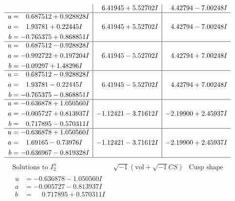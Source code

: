 \documentclass[1p]{elsarticle_modified}
\theoremstyle{definition}
\newcommand{\I}{\sqrt{-1}}
\begin{document}
$$\begin{array}{c|c|c}
 & \phantom{-}6.41945 + 5.52702 I & \phantom{-}4.42794 - 7.00248 I \\ \hline\begin{aligned}
u &= \phantom{-}0.687512 + 0.928828 I \\
a &= \phantom{-}1.93781 + 0.22445 I \\
b &= -0.765375 + 0.868851 I\end{aligned}
 & \phantom{-}6.41945 + 5.52702 I & \phantom{-}4.42794 - 7.00248 I \\ \hline\begin{aligned}
u &= \phantom{-}0.687512 - 0.928828 I \\
a &= -0.992722 + 0.197204 I \\
b &= -0.09297 + 1.48296 I\end{aligned}
 & \phantom{-}6.41945 - 5.52702 I & \phantom{-}4.42794 + 7.00248 I \\ \hline\begin{aligned}
u &= \phantom{-}0.687512 - 0.928828 I \\
a &= \phantom{-}1.93781 - 0.22445 I \\
b &= -0.765375 - 0.868851 I\end{aligned}
 & \phantom{-}6.41945 - 5.52702 I & \phantom{-}4.42794 + 7.00248 I \\ \hline\begin{aligned}
u &= -0.636878 + 1.050560 I \\
a &= -0.005727 + 0.813937 I \\
b &= \phantom{-}0.717895 - 0.570311 I\end{aligned}
 & -1.12421 - 3.71612 I & -2.19900 + 2.45937 I \\ \hline\begin{aligned}
u &= -0.636878 + 1.050560 I \\
a &= \phantom{-}1.69165 - 0.73976 I \\
b &= -0.636967 - 0.819328 I\end{aligned}
 & -1.12421 - 3.71612 I & -2.19900 + 2.45937 I\\
 \hline 
 \end{array}$$\newpage$$\begin{array}{c|c|c}  
\text{Solutions to }I^u_{2}& \I (\text{vol} + \sqrt{-1}CS) & \text{Cusp shape}\\
 \hline 
\begin{aligned}
u &= -0.636878 - 1.050560 I \\
a &= -0.005727 - 0.813937 I \\
b &= \phantom{-}0.717895 + 0.570311 I\end{aligned}

\end{array}$$
\end{document}
